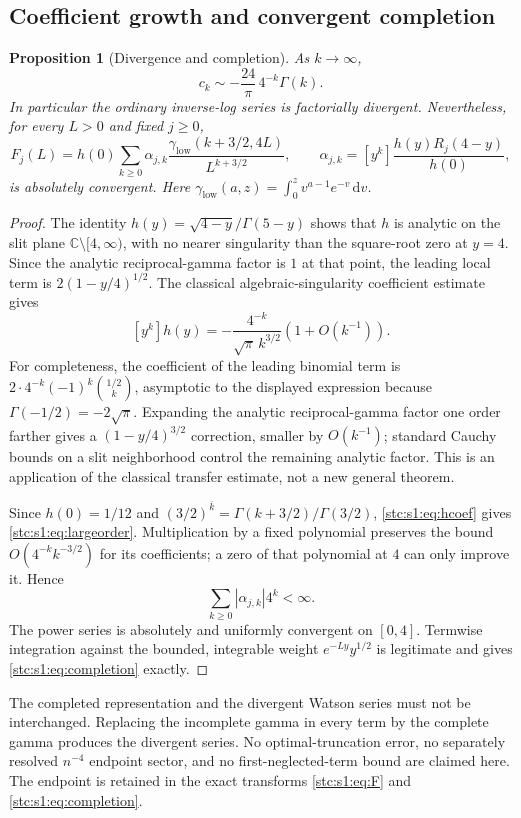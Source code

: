 \documentclass[11pt,letterpaper]{article}
\numberwithin{equation}{section}
\newtheorem{proposition}[theorem]{Proposition}
\theoremstyle{remark}\newtheorem{remark}[theorem]{Remark}
\newcommand{\dd}{\,\mathrm d}
\newcommand{\rf}[2]{#1^{\overline{#2}}}
\newcommand{\coef}[2]{[#1^{#2}]}
\newcommand{\Ga}{\Gamma}
\begin{document}
\subsection{Coefficient growth and convergent completion}
\begin{proposition}[Divergence and completion]\label{stc:s1:prop:completion}
As $k\to\infty$,
\begin{equation}\label{stc:s1:eq:largeorder}
 c_k\sim-\frac{24}{\pi}\,4^{-k}\Ga(k).
\end{equation}
In particular the ordinary inverse-log series is factorially divergent. Nevertheless, for every $L>0$ and fixed $j\geq0$,
\begin{equation}\label{stc:s1:eq:completion}
 F_j(L)=h(0)\sum_{k\geq0}\alpha_{j,k}
       \frac{\gamma_{\mathrm{low}}(k+3/2,4L)}{L^{k+3/2}},
 \qquad
 \alpha_{j,k}=\coef{y}{k}\frac{h(y)R_j(4-y)}{h(0)},
\end{equation}
is absolutely convergent. Here $\gamma_{\mathrm{low}}(a,z)=\int_0^z v^{a-1}e^{-v}\dd v$.
\end{proposition}
\begin{proof}
The identity $h(y)=\sqrt{4-y}/\Ga(5-y)$ shows that $h$ is analytic on the slit plane $\mathbb C\setminus[4,\infty)$, with no nearer singularity than the square-root zero at $y=4$. Since the analytic reciprocal-gamma factor is $1$ at that point, the leading local term is $2(1-y/4)^{1/2}$. The classical algebraic-singularity coefficient estimate \cite{flajoletodlyzko} gives
\begin{equation}\label{stc:s1:eq:hcoef}
 \coef{y}{k}h(y)=-\frac{4^{-k}}{\sqrt\pi\,k^{3/2}}
                     (1+O(k^{-1})).
\end{equation}
For completeness, the coefficient of the leading binomial term is $2\cdot4^{-k}(-1)^k\binom{1/2}{k}$, asymptotic to the displayed expression because $\Ga(-1/2)=-2\sqrt\pi$. Expanding the analytic reciprocal-gamma factor one order farther gives a $(1-y/4)^{3/2}$ correction, smaller by $O(k^{-1})$; standard Cauchy bounds on a slit neighborhood control the remaining analytic factor. This is an application of the classical transfer estimate, not a new general theorem.

Since $h(0)=1/12$ and $\rf{(3/2)}{k}=\Ga(k+3/2)/\Ga(3/2)$, \eqref{stc:s1:eq:hcoef} gives \eqref{stc:s1:eq:largeorder}. Multiplication by a fixed polynomial preserves the bound $O(4^{-k}k^{-3/2})$ for its coefficients; a zero of that polynomial at $4$ can only improve it. Hence
\[
 \sum_{k\geq0}|\alpha_{j,k}|4^k<\infty.
\]
The power series is absolutely and uniformly convergent on $[0,4]$. Termwise integration against the bounded, integrable weight $e^{-Ly}y^{1/2}$ is legitimate and gives \eqref{stc:s1:eq:completion} exactly.
\end{proof}
The completed representation and the divergent Watson series must not be interchanged. Replacing the incomplete gamma in every term by the complete gamma produces the divergent series. No optimal-truncation error, no separately resolved $n^{-4}$ endpoint sector, and no first-neglected-term bound are claimed here. The endpoint is retained in the exact transforms \eqref{stc:s1:eq:F} and \eqref{stc:s1:eq:completion}.
\end{document}
